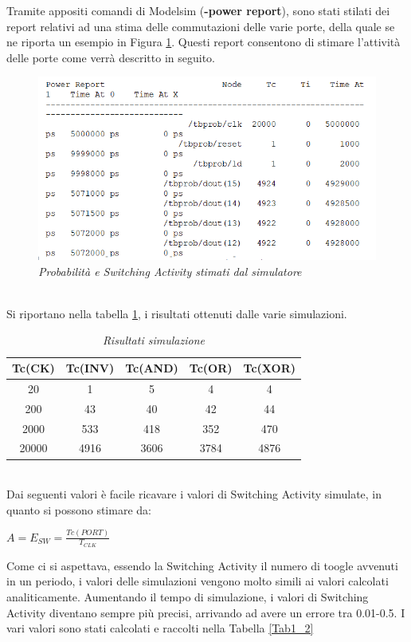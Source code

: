 Tramite appositi comandi di Modelsim (\textbf{-power report}), sono stati stilati dei report relativi ad una stima delle commutazioni delle varie porte, della quale se ne riporta un esempio in Figura \ref{fig1_2}. Questi report consentono di stimare l'attività delle porte come verrà descritto in seguito.\\
\begin{figure}[!htb]
	\centering
	\includegraphics[scale=1]{immagini/fig1_2}
	\caption{\textit{Probabilità e Switching Activity stimati dal simulatore}}
	\label{fig1_2}
\end{figure} \\
Si riportano nella tabella \ref{tab1}, i risultati ottenuti dalle varie simulazioni.
\begin{table}[!h]\footnotesize
	\centering
	\begin{tabular}{|c|c|c|c|c|}
		\hline
		\textbf{Tc(CK)} & \textbf{Tc(INV)}& \textbf{Tc(AND)}& \textbf{Tc(OR)} &\textbf{Tc(XOR)}\\
		\hline
		20 & 1  & 5& 4&4\\
		\hline
		200 &  43 &40&42& 44\\
		\hline
		2000& 533& 418&352&470\\
		\hline
		20000& 4916& 3606&3784&4876\\
		\hline
	\end{tabular}
	\caption{\textit{Risultati simulazione}}
	\label{tab1}
\end{table}\\
Dai seguenti valori è facile ricavare i valori di Switching Activity simulate, in quanto si possono stimare da:
\begin{center}
	$ A=E_{SW}=\frac{Tc(PORT)}{T_{CLK}} $
\end{center}
Come ci si aspettava, essendo la Switching Activity il numero di toogle avvenuti in un periodo, i valori delle simulazioni vengono molto simili ai valori calcolati analiticamente. Aumentando il tempo di simulazione, i valori di Switching Activity diventano sempre più precisi, arrivando ad avere un errore tra 0.01-0.5. I vari valori sono stati calcolati e raccolti nella Tabella \ref{Tab1_2}
